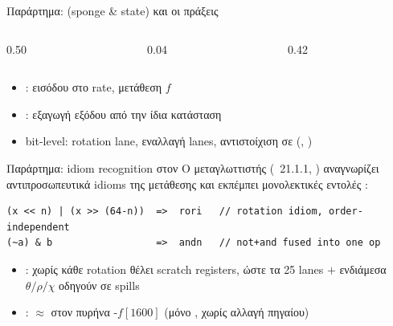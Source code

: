 \begin{frame}{Παράρτημα:  (sponge \& state) και οι πράξεις \Zbb}
  \begin{columns}[T,onlytextwidth]
    \begin{column}{0.50\textwidth}
      \resizebox{\linewidth}{!}{}
    \end{column}
    \begin{column}{0.04\textwidth}
      \centering
      {\tikzexternaldisable
       }
    \end{column}
    \begin{column}{0.42\textwidth}
      \resizebox{\linewidth}{!}{}
    \end{column}
  \end{columns}
  \vspace{0.3em}
  \begin{itemize}
    \item {}:  εισόδου στο rate, μετάθεση $f$
    \item {}: εξαγωγή εξόδου από την ίδια κατάσταση
    \item bit-level: rotation lane, εναλλαγή lanes, αντιστοίχιση σε \Zbb (\rori, )
  \end{itemize}
\end{frame}

\begin{frame}[fragile]{Παράρτημα:  idiom recognition στον }
  Ο μεταγλωττιστής (~21.1.1, ) αναγνωρίζει αντιπροσωπευτικά
   idioms της μετάθεσης και εκπέμπει μονολεκτικές εντολές \Zbb:
  \begin{lstlisting}
(x << n) | (x >> (64-n))  =>  rori   // rotation idiom, order-independent
(~a) & b                  =>  andn   // not+and fused into one op
  \end{lstlisting}
  \begin{itemize}\small
    \item {}: χωρίς \rori κάθε rotation θέλει scratch registers, ώστε τα \num{25} lanes $+$ ενδιάμεσα $\theta/\rho/\chi$ οδηγούν σε spills
    \item {}: ${\approx}$ στον πυρήνα -$f[1600]$ (μόνο , χωρίς αλλαγή πηγαίου)
  \end{itemize}
\end{frame}

